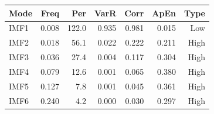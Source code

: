 {\tiny\setlength{\tabcolsep}{1pt}\begin{tabular}{lrrrrrr} \toprule
Mode & Freq & Per & VarR & Corr & ApEn & Type \\ \midrule
IMF1 & 0.008 & 122.0 & 0.935 & 0.981 & 0.015 & Low \\ 
IMF2 & 0.018 & 56.1 & 0.022 & 0.222 & 0.211 & High \\ 
IMF3 & 0.036 & 27.4 & 0.004 & 0.117 & 0.304 & High \\ 
IMF4 & 0.079 & 12.6 & 0.001 & 0.065 & 0.380 & High \\ 
IMF5 & 0.127 & 7.8 & 0.001 & 0.045 & 0.361 & High \\ 
IMF6 & 0.240 & 4.2 & 0.000 & 0.030 & 0.297 & High \\ 
\bottomrule \end{tabular}}